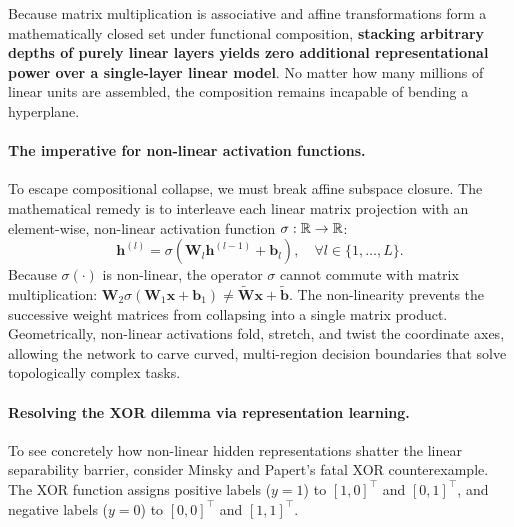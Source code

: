 Because matrix multiplication is associative and affine transformations form a mathematically closed set under functional composition, \textbf{stacking arbitrary depths of purely linear layers yields zero additional representational power over a single-layer linear model}. No matter how many millions of linear units are assembled, the composition remains incapable of bending a hyperplane.

\paragraph{The imperative for non-linear activation functions.}
To escape compositional collapse, we must break affine subspace closure. The mathematical remedy is to interleave each linear matrix projection with an element-wise, non-linear activation function $\sigma: \mathbb{R} \to \mathbb{R}$:
\begin{equation}
\mathbf{h}^{(l)} = \sigma\left( \mathbf{W}_l \mathbf{h}^{(l-1)} + \mathbf{b}_l \right), \quad \forall l \in \{1, \dots, L\}.
\label{eq:interleaved_nonlinear_layer}
\end{equation}
Because $\sigma(\cdot)$ is non-linear, the operator $\sigma$ cannot commute with matrix multiplication: $\mathbf{W}_2 \sigma(\mathbf{W}_1 \mathbf{x} + \mathbf{b}_1) \ne \tilde{\mathbf{W}} \mathbf{x} + \tilde{\mathbf{b}}$. The non-linearity prevents the successive weight matrices from collapsing into a single matrix product. Geometrically, non-linear activations fold, stretch, and twist the coordinate axes, allowing the network to carve curved, multi-region decision boundaries that solve topologically complex tasks.

\paragraph{Resolving the XOR dilemma via representation learning.}
To see concretely how non-linear hidden representations shatter the linear separability barrier, consider Minsky and Papert's fatal XOR counterexample. The XOR function assigns positive labels ($y=1$) to $[1, 0]^\top$ and $[0, 1]^\top$, and negative labels ($y=0$) to $[0, 0]^\top$ and $[1, 1]^\top$.

